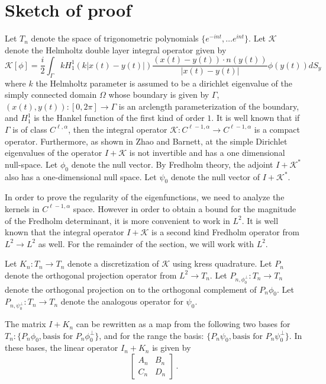\section{Sketch of proof}
\label{sec:appb}
Let $T_{n}$ denote the space of trigonometric polynomials
$\{ e^{-int}, \ldots e^{int} \}$. 
Let $\mathcal{K}$ denote the Helmholtz double layer integral operator
given by
\begin{equation}
\mathcal{K}[\phi] = \frac{i}{2}\int_{\Gamma} k H_{1}^{1}(k|x(t)-y(t)|) \frac{(x(t)-y(t))\cdot n(y(t))}{|x(t)-y(t)|} \phi(y(t)) dS_{y} \,
\end{equation}
where $k$ the Helmholtz parameter is assumed to be a dirichlet eigenvalue of the simply connected
domain $\Omega$ whose boundary is given by $\Gamma$, $(x(t),y(t)): [0,2\pi] \to \Gamma$ is
an arclength parameterization of the boundary, and $H_{1}^{1}$ is the Hankel function
of the first kind of order $1$.
It is well known that if $\Gamma$ is of class $C^{\ell,\alpha}$, then the
integral operator $\mathcal{K}: C^{\ell-1,\alpha} \to C^{\ell-1,\alpha}$ is a compact operator.
Furthermore, as shown in Zhao and Barnett, at the simple Dirichlet eigenvalues of the operator
$I + \mathcal{K}$ is not invertible and has a one dimensional null-space. Let $\phi_{0}$ denote
the null vector. 
By Fredholm theory, the adjoint $I + \mathcal{K}^{\ast}$ also has a one-dimensional null space.
Let $\psi_{0}$ denote the null vector of $I+\mathcal{K}^{\ast}$.

In order to prove the regularity of the eigenfunctions, we need to analyze
the kernels in $C^{\ell-1,\alpha}$ space. 
However in order to obtain a bound for the magnitude of the Fredholm
determinant, it is more convenient to work in $L^{2}$. It is well known
that the integral operator $I + \mathcal{K}$ is a second kind
Fredholm operator from $L^{2} \to L^{2}$ as well.
For the remainder of the section, we will work with $L^{2}$.


Let $K_{n}: T_{n} \to T_{n}$ 
denote a discretization of $\mathcal{K}$ 
using kress quadrature. 
Let $P_{n}$ denote the orthogonal 
projection operator from $L^{2} \to T_{n}$.
Let $P_{n,\phi_{0}^{\perp}}: T_{n} \to T_{n}$ denote the orthogonal
projection on to the orthogonal complement of $P_{n} \phi_{0}$.
Let $P_{n,\psi_{0}^{\perp}}: T_{n} \to T_{n}$ denote the
analogous operator for $\psi_{0}$. 

The matrix $I+K_{n}$ can be rewritten as a map from the
following two bases for $T_{n}: \{ P_{n} \phi_{0}, \text{basis for }
P_{n}\phi_{0}^{\perp} \}$, and for the range the basis:
$\{ P_{n} \psi_{0}, \text{basis for } P_{n} \psi_{0}^{\perp} \}$.
In these bases, the linear operator $I_{n} + K_{n}$ is given by
\begin{equation}
\begin{bmatrix}
A_{n} & B_{n} \\
C_{n} & D_{n} 
\end{bmatrix} \, .
\end{equation}

